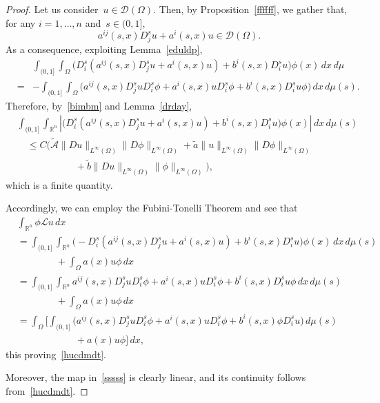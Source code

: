 \documentclass[11pt,hyp,]{nyjm}
\numberwithin{equation}{section}
\newcommand{\R}{\mathbb{R}}
\theoremstyle{remark}
\renewcommand{\leq}{\leqslant}
\begin{document}
\begin{proof}
Let us consider~$u \in \mathcal{D}(\Omega)$. Then, by Proposition~\ref{ffffff}, we gather that, for any $i=1,\ldots,n$
and~$s\in(0,1]$,
\[ a^{ij}(s,x) D^s_j u + a^i(s,x) u \in \mathcal{D}(\Omega). \]
As a consequence, exploiting Lemma~\ref{eduldp},
\begin{eqnarray*}
&& \int_{(0,1]} \int_{\Omega}\Big( D^s_i \left(a^{ij}(s,x) D^s_j u + a^i(s,x) u \right) + b^i(s,x) D^s_i u  \Big) \phi(x)\, dx \, d\mu \\
& =& -\int_{(0,1]} \int_{\Omega}  \Big(a^{ij}(s,x) D^s_j u D^s_i \phi + a^i(s,x) u D^s_i \phi + b^i(s,x) D^s_i u \phi\Big) \, dx \, d\mu (s).
\end{eqnarray*}
Therefore, by~\eqref{bimbm} and Lemma~\ref{drday},
\begin{equation*}
\begin{split}
&\int_{(0,1]} \int_{\R^n} \left|\Big(D^s_i \left(a^{ij}(s,x) D^s_j u + a^i(s,x) u \right) + b^i(s,x) D^s_i u \Big)\phi(x)\right|\, dx \, d\mu (s)  \\
&\quad\leq C \Big(\tilde{\mathcal{A}} \|Du\|_{L^{\infty}(\Omega)} \|D\phi\|_{L^{\infty}(\Omega)} + \tilde{a} \| u \|_{L^{\infty}(\Omega)} \|D\phi\|_{L^{\infty}(\Omega)}  \\ &\qquad\qquad\qquad+ \tilde{b} \|Du\|_{L^{\infty}(\Omega)} \|\phi\|_{L^{\infty}(\Omega)}\Big),
\end{split}
\end{equation*}
which is a finite quantity.

Accordingly, we can employ the Fubini-Tonelli Theorem and see that
\begin{equation*}
\begin{split}&
 \int_{\R^n}  \phi \mathcal{L}u  \, dx\\ &= \int_{(0,1]} \int_{\R^n} \Big( -D^s_i \left(a^{ij}(s,x) D^s_j u + a^i(s,x) u \right) + b^i(s,x) D^s_i u \Big)\phi(x) \, dx \, d\mu (s)\\&\qquad\qquad+ \int_{\Omega} a(x) u \phi \, dx\\
&= \int_{(0,1]} \int_{\R^n} a^{ij}(s,x) D^s_j u D^s_i \phi + a^i(s,x) u D^s_i \phi + b^i(s,x) D^s_i u \phi \, dx \, d\mu (s)\\&\qquad\qquad+ \int_{\Omega} a(x) u \phi \, dx\\
&= \int_{\Omega} \Bigg[ \int_{(0,1]} \Big(a^{ij}(s,x) D^s_ju D^s_i \phi + a^i(s,x) u D^s_i \phi + b^i(s,x)\phi D^s_i u \Big)\, d\mu(s)\\&\qquad\qquad\qquad+ a(x) u \phi   \Bigg] \, dx,
\end{split}
\end{equation*}
this proving~\eqref{hucdmdt}.

Moreover, the map in~\eqref{sssss} is clearly linear, and its continuity follows from~\eqref{hucdmdt}.
\end{proof}
\end{document}
